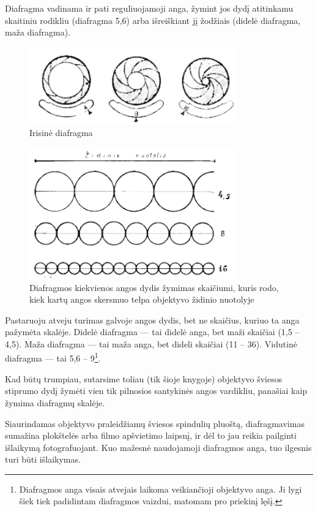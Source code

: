 \documentclass{book}
\begin{document}
					Diafragma vadinama ir pati reguliuojamoji anga, žymint jos dydį atitinkamu skaitiniu rodikliu (diafragma 5,6) arba išreiškiant jį žodžiais (didelė diafragma, maža diafragma).
					\begin{figure}[h]
						\centering
						\includegraphics[width=0.8\textwidth]{3-pav}
						\caption{Irisinė diafragma}
						\label{fig:3}
					\end{figure}
					\begin{figure}[h]
						\centering
						\includegraphics[width=0.8\textwidth]{4-pav}
						\caption{Diafragmos kiekvienos angos dydis žymimas skaičiumi, kuris rodo, kiek kartų angos skersmuo telpa objektyvo židinio nuotolyje}
						\label{fig:4}
					\end{figure}
					Pastaruoju atveju turimas galvoje angos dydis, bet ne skaičius, kuriuo ta anga pažymėta skalėje. Didelė diafragma --- tai didelė anga, bet maži skaičiai (1,5 -- 4,5). Maža diafragma --- tai maža anga, bet dideli skaičiai (11 -- 36). Vidutinė diafragma --- tai 5,6 -- 9\footnote{Diafragmos anga visais atvejais laikoma veikiančioji objektyvo anga. Ji lygi šiek tiek padidintam diafragmos vaizdui, matomam pro priekinį lęšį.}.

					Kad būtų trumpiau, sutarsime toliau (tik šioje knygoje) objektyvo šviesos stiprumo dydį žymėti vien tik pilnosios santykinės angos vardikliu, panašiai kaip žymima diafragmų skalėje.

					Siaurindamas objektyvo praleidžiamų šviesos spindulių pluoštą, diafragmavimas sumažina plokštelės arba filmo apšvietimo laipsnį, ir dėl to jau reikia pailginti išlaikymą fotografuojant. Kuo mažesnė naudojamoji diafragmos anga, tuo ilgesnis turi būti išlaikymas.
\end{document}
